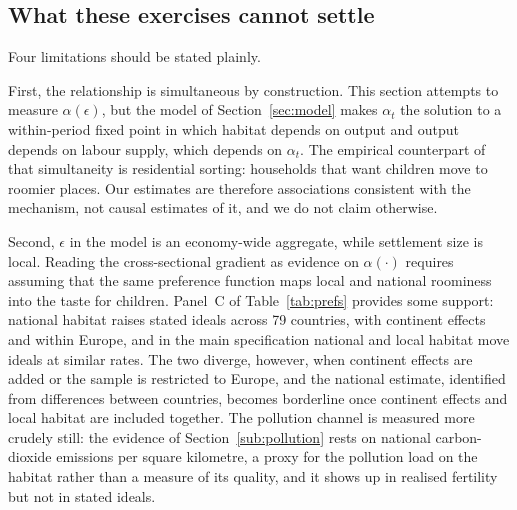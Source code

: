 \documentclass[11pt]{article}
\begin{document}
\subsection{What these exercises cannot settle}
\label{sub:caveats}

Four limitations should be stated plainly.

First, the relationship is simultaneous by construction. This section attempts to
measure $\alpha(\epsilon)$, but the model of Section~\ref{sec:model} makes $\alpha_t$ the solution to a
within-period fixed point in which habitat depends on output and output depends on labour supply,
which depends on $\alpha_t$. The empirical counterpart of that simultaneity is residential sorting:
households that want children move to roomier places. Our estimates are therefore associations
consistent with the mechanism, not causal estimates of it, and we do not claim otherwise.

Second, $\epsilon$ in the model is an economy-wide aggregate, while settlement size is local.
Reading the cross-sectional gradient as evidence on $\alpha(\cdot)$ requires assuming that the same
preference function maps local and national roominess into the taste for children. Panel~C of
Table~\ref{tab:prefs} provides some support: national habitat raises stated ideals across 79
countries, with continent effects and within Europe, and in the main specification national and
local habitat move ideals at similar rates. The two diverge, however, when continent effects are
added or the sample is restricted to Europe, and the national estimate, identified from differences
between countries, becomes borderline once continent effects and local habitat are included
together. The pollution channel is measured more crudely still: the evidence of
Section~\ref{sub:pollution} rests on national carbon-dioxide emissions per square kilometre, a proxy for
the pollution load on the habitat rather than a measure of its quality, and it shows up in realised
fertility but not in stated ideals.
\end{document}
